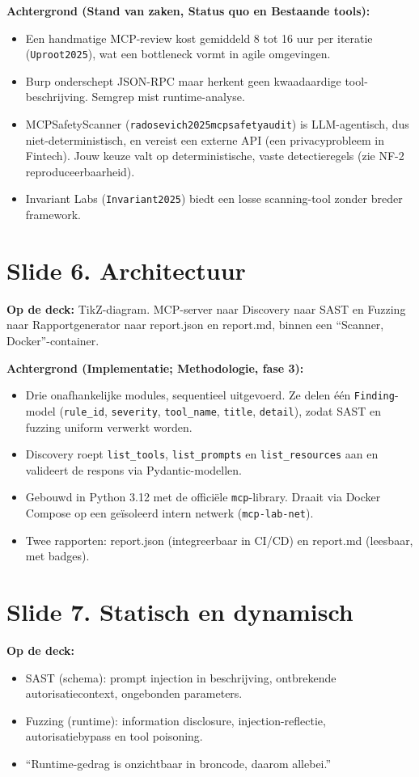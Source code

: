 \documentclass[11pt,a4paper]{article}
\newcommand{\code}[1]{\texttt{\small #1}}
\begin{document}
\textbf{Achtergrond (Stand van zaken, Status quo en Bestaande tools):}
\begin{itemize}
  \item Een handmatige MCP-review kost gemiddeld 8 tot 16 uur per iteratie (\code{Uproot2025}), wat een bottleneck vormt in agile omgevingen.
  \item Burp onderschept JSON-RPC maar herkent geen kwaadaardige tool-beschrijving. Semgrep mist runtime-analyse.
  \item MCPSafetyScanner (\code{radosevich2025mcpsafetyaudit}) is LLM-agentisch, dus niet-deterministisch, en vereist een externe API (een privacyprobleem in Fintech). Jouw keuze valt op deterministische, vaste detectieregels (zie NF-2 reproduceerbaarheid).
  \item Invariant Labs (\code{Invariant2025}) biedt een losse scanning-tool zonder breder framework.
\end{itemize}

\section{Slide 6. Architectuur}
\textbf{Op de deck:} TikZ-diagram. MCP-server naar Discovery naar SAST en Fuzzing naar Rapportgenerator naar report.json en report.md, binnen een ``Scanner, Docker''-container.

\textbf{Achtergrond (Implementatie; Methodologie, fase 3):}
\begin{itemize}
  \item Drie onafhankelijke modules, sequentieel uitgevoerd. Ze delen \'e\'en \code{Finding}-model (\code{rule\_id}, \code{severity}, \code{tool\_name}, \code{title}, \code{detail}), zodat SAST en fuzzing uniform verwerkt worden.
  \item Discovery roept \code{list\_tools}, \code{list\_prompts} en \code{list\_resources} aan en valideert de respons via Pydantic-modellen.
  \item Gebouwd in Python 3.12 met de offici\"ele \code{mcp}-library. Draait via Docker Compose op een ge\"isoleerd intern netwerk (\code{mcp-lab-net}).
  \item Twee rapporten: report.json (integreerbaar in CI/CD) en report.md (leesbaar, met badges).
\end{itemize}

\section{Slide 7. Statisch en dynamisch}
\textbf{Op de deck:}
\begin{itemize}
  \item SAST (schema): prompt injection in beschrijving, ontbrekende autorisatiecontext, ongebonden parameters.
  \item Fuzzing (runtime): information disclosure, injection-reflectie, autorisatiebypass en tool poisoning.
  \item ``Runtime-gedrag is onzichtbaar in broncode, daarom allebei.''
\end{itemize}
\end{document}
